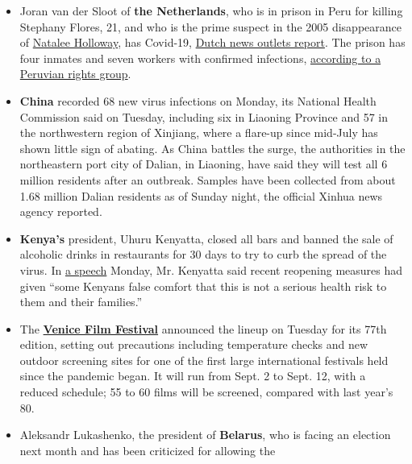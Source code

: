 \begin{itemize}
\item
  Joran van der Sloot of \textbf{the Netherlands}, who is in prison in
  Peru for killing Stephany Flores, 21, and who is the prime suspect in
  the 2005 disappearance of
  \href{https://www.nytimes3xbfgragh.onion/2012/01/12/world/americas/peru-suspect-in-holloway-case-pleads-guilty-in-lima-murder.html}{Natalee
  Holloway}, has Covid-19,
  \href{https://www.rtlnieuws.nl/nieuws/buitenland/artikel/5173750/joran-van-der-sloot-met-corona-peruaanse-gevangenis}{Dutch
  news outlets report}. The prison has four inmates and seven workers
  with confirmed infections,
  \href{https://www.defensoria.gob.pe/defensoria-del-pueblo-se-debe-garantizar-salud-de-internos-y-trabajadores-de-penal-de-juliaca/\#}{according
  to a Peruvian rights group}.
\item
  \textbf{China} recorded 68 new virus infections on Monday, its
  National Health Commission said on Tuesday, including six in Liaoning
  Province and 57 in the northwestern region of Xinjiang, where a
  flare-up since mid-July has shown little sign of abating. As China
  battles the surge, the authorities in the northeastern port city of
  Dalian, in Liaoning, have said they will test all 6 million residents
  after an outbreak. Samples have been collected from about 1.68 million
  Dalian residents as of Sunday night, the official Xinhua news agency
  reported.
\item
  \textbf{Kenya's} president, Uhuru Kenyatta, closed all bars and banned
  the sale of alcoholic drinks in restaurants for 30 days to try to curb
  the spread of the virus. In
  \href{https://www.youtube.com/watch?v=JVUfyoR7In0}{a speech} Monday,
  Mr. Kenyatta said recent reopening measures had given ``some Kenyans
  false comfort that this is not a serious health risk to them and their
  families.''
\item
  The
  \textbf{\href{https://www.nytimes3xbfgragh.onion/2020/07/28/movies/venice-film-festival-2020-coronavirus.html}{Venice
  Film Festival}} announced the lineup on Tuesday for its 77th edition,
  setting out precautions including temperature checks and new outdoor
  screening sites for one of the first large international festivals
  held since the pandemic began. It will run from Sept. 2 to Sept. 12,
  with a reduced schedule; 55 to 60 films will be screened, compared
  with last year's 80.
\item
  Aleksandr Lukashenko, the president of \textbf{Belarus}, who is facing
  an election next month and has been criticized for allowing the

\end{itemize}
